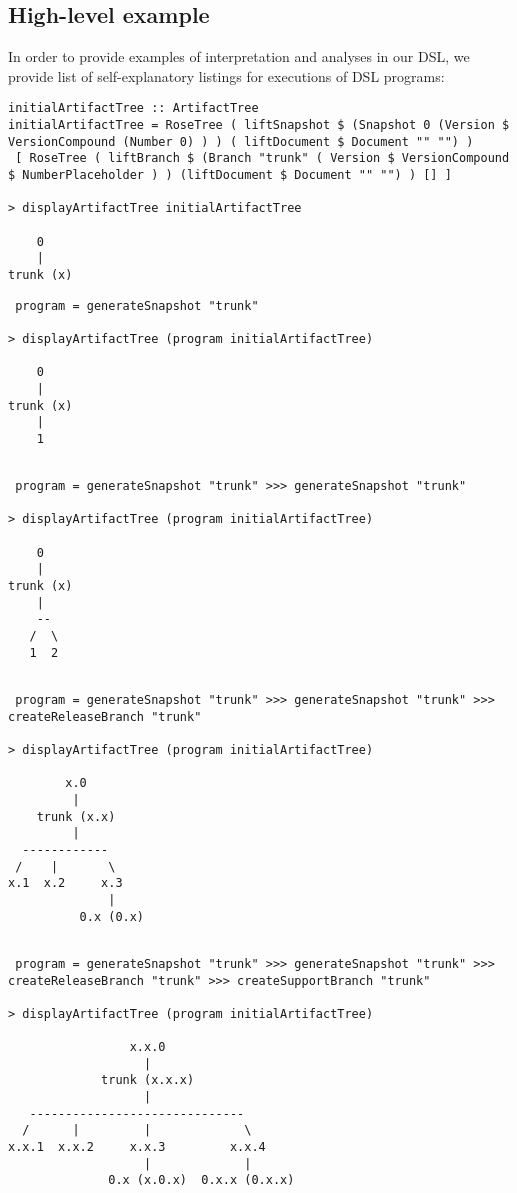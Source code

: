 \documentclass[11pt]{article}
\begin{document}
\subsection{High-level example}
In order to provide examples of interpretation and analyses in our DSL, we provide list of self-explanatory listings for executions of DSL programs: 
\begin{lstlisting}
initialArtifactTree :: ArtifactTree 
initialArtifactTree = RoseTree ( liftSnapshot $ (Snapshot 0 (Version $  VersionCompound (Number 0) ) ) ( liftDocument $ Document "" "") ) 
 [ RoseTree ( liftBranch $ (Branch "trunk" ( Version $ VersionCompound $ NumberPlaceholder ) ) (liftDocument $ Document "" "") ) [] ]
 
> displayArtifactTree initialArtifactTree 

    0    
    |    
trunk (x)
 \end{lstlisting}
 \begin{lstlisting}
 program = generateSnapshot "trunk" 
 
> displayArtifactTree (program initialArtifactTree)
 
    0    
    |    
trunk (x)
    |    
    1   
 
 \end{lstlisting}
 
 \begin{lstlisting}
 program = generateSnapshot "trunk" >>> generateSnapshot "trunk"
 
> displayArtifactTree (program initialArtifactTree)
 
    0    
    |    
trunk (x)
    |    
    --   
   /  \  
   1  2  
 
 \end{lstlisting}
 
  \begin{lstlisting}
 program = generateSnapshot "trunk" >>> generateSnapshot "trunk" >>> createReleaseBranch "trunk"
 
> displayArtifactTree (program initialArtifactTree)
 
        x.0        
         |         
    trunk (x.x)    
         |         
  ------------     
 /    |       \    
x.1  x.2     x.3   
              |    
          0.x (0.x)
 
 \end{lstlisting}
 \begin{lstlisting}
 program = generateSnapshot "trunk" >>> generateSnapshot "trunk" >>> createReleaseBranch "trunk" >>> createSupportBranch "trunk"
 
> displayArtifactTree (program initialArtifactTree)
 
                 x.x.0                  
                   |                    
             trunk (x.x.x)              
                   |                    
   ------------------------------       
  /      |         |             \      
x.x.1  x.x.2     x.x.3         x.x.4    
                   |             |      
              0.x (x.0.x)  0.x.x (0.x.x)

 
 \end{lstlisting}
\end{document}
